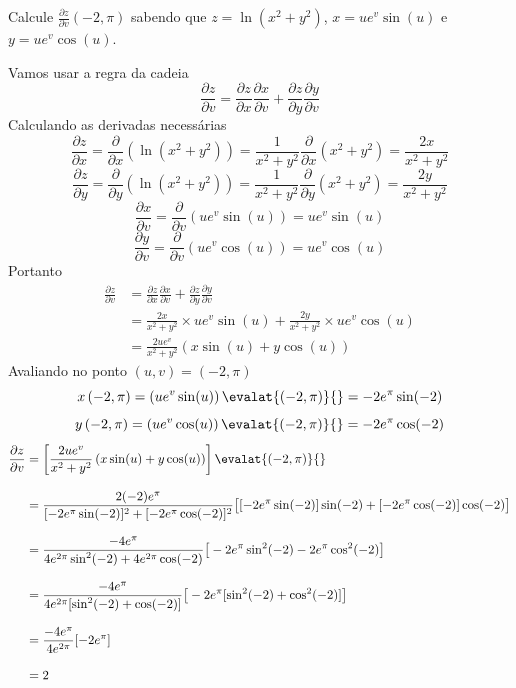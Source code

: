 \documentclass[a4paper,12pt,fleqn]{article}
\newcommand{\D}[2]{\frac{\partial {#1}}{\partial {#2}}}
\begin{document}
\clearpage


Calcule \(\D{z}{v}\left(-2, \pi\right)\) sabendo que
\(
  z = \ln\left(x^2+y^2\right)
\),
\(
  x = ue^v\sin(u)
\)
e
\(
  y = ue^v\cos(u)
\).

\begin{answer}
  Vamos usar a regra da cadeia
  \[
    \D{z}{v} = \D{z}{x}\D{x}{v} + \D{z}{y}\D{y}{v}
  \]
  Calculando as derivadas necessárias
  \[
    \D{z}{x}
    = \D{}{x}\left(\ln\left(x^2+y^2\right)\right)
    = \frac{1}{x^2+y^2}\D{}{x}(x^2+y^2)
    = \frac{2x}{x^2+y^2}
  \]
  \[
    \D{z}{y}
    = \D{}{y}\left(\ln\left(x^2+y^2\right)\right)
    = \frac{1}{x^2+y^2}\D{}{y}(x^2+y^2)
    = \frac{2y}{x^2+y^2}
  \]
  \[
    \D{x}{v}
    = \D{}{v}\left(ue^v\sin(u)\right)
    = ue^v\sin(u)
  \]
  \[
    \D{y}{v}
    = \D{}{v}\left(ue^v\cos(u)\right)
    = ue^v\cos(u)
  \]
  Portanto
  \begin{align*}
    \D{z}{v}
    & = \D{z}{x}\D{x}{v} + \D{z}{y}\D{y}{v} \\[2mm]
    & = \frac{2x}{x^2+y^2} \times ue^v\sin(u)
      + \frac{2y}{x^2+y^2} \times ue^v\cos(u) \\[2mm]
    & = \frac{2ue^v}{x^2+y^2} \left(x\sin(u) + y\cos(u)\right)
  \end{align*}
  Avaliando no ponto \((u, v) = \left(-2, \pi\right)\)
  \[
    x\left(-2, \pi\right)
    = \left(ue^v\sin(u)\right)\evalat{(-2, \pi)}{}
    = -2e^\pi\sin(-2)
  \]
  \[
    y\left(-2, \pi\right)
    = \left(ue^v\cos(u)\right)\evalat{(-2, \pi)}{}
    = -2e^\pi\cos(-2)
  \]
  \begin{align*}
    \D{z}{v}
    & = \left[\frac{2ue^v}{x^2+y^2} \left(x\sin(u) + y\cos(u)\right)\right]\evalat{(-2, \pi)}{} \\[3mm]
    & = \frac{2(-2)e^\pi}{[-2e^\pi\sin(-2)]^2+[-2e^\pi\cos(-2)]^2}
        \big[[-2e^\pi\sin(-2)]\sin(-2) + [-2e^\pi\cos(-2)]\cos(-2)\big] \\[3mm]
    & = \frac{-4e^\pi}{4e^{2\pi}\sin^2(-2) + 4e^{2\pi}\cos(-2)}
        \big[-2e^\pi\sin^2(-2) -2e^\pi\cos^2(-2)\big]  \\[3mm]
    & = \frac{-4e^\pi}{4e^{2\pi}[\sin^2(-2) + \cos(-2)]}
        \big[-2e^\pi[\sin^2(-2) +\cos^2(-2)]\big] \\[3mm]
    & = \frac{-4e^{\pi}}{4e^{2\pi}}[-2e^\pi] \\[3mm]
    & = 2
  \end{align*}
  \clearpage
\end{answer}
\end{document}
